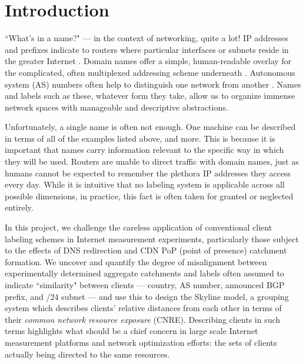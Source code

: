 \section{Introduction} \label{sect:intro}

``What's in a name?" --- in the context of networking, quite a lot! IP addresses and prefixes
indicate to routers where particular interfaces or subnets reside in the greater Internet
\cite{bgp}. Domain
names offer a simple, human-readable overlay for the complicated, often multiplexed addressing
scheme underneath \cite{dns}. Autonomous system (AS) numbers often help to distinguish one network
from another \cite{asn}.
Names and labels such as these, whatever form they take, allow us to organize immense network spaces
with manageable and descriptive abstractions.

Unfortunately, a single name is often not enough. One machine can be described in terms of all of
the examples listed above, and more. This is because it is important that names carry information
relevant to the specific way in which they will be used. Routers are unable to direct traffic with
domain names, just as humans cannot be expected to remember the plethora IP addresses they access
every day. While it is intuitive that no labeling system is applicable across all possible
dimensions, in practice, this fact is often taken for granted or neglected entirely.

In this project, we challenge the careless application of conventional client labeling schemes in
Internet measurement experiments, particularly those subject to the effects of DNS redirection and
CDN PoP (point of presence) catchment formation. We uncover and quantify the degree of misalignment
between experimentally determined aggregate catchments and labels often assumed to indicate
``similarity" between clients --- country, AS number, announced BGP prefix, and /24 subnet --- and
use this to design the Skyline model, a grouping system which describes clients' relative distances
from each other in terms of their \emph{common network resource exposure} (CNRE). Describing clients in such
terms highlights what should be a chief concern in large scale Internet measurement platforms and
network optimization efforts: the sets of clients actually being directed to the same resources.

